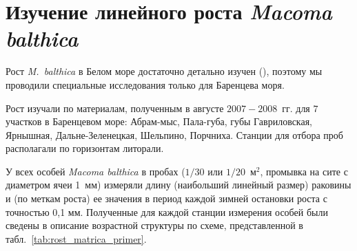\afterpage{\clearpage}

	\section{Изучение линейного роста {\it Macoma balthica}}
Рост \textit{M.~balthica} в Белом море достаточно детально изучен (\cite{Semenova_1970, Maximovich_et_al_1992, Hummel_et_al_1998}), поэтому мы проводили специальные исследования только для Баренцева моря.

Рост изучали по материалам, полученным в августе $2007 - 2008$~гг. для $7$ участков в Баренцевом море: Абрам-мыс, Пала-губа, губы Гавриловская, Ярнышная, Дальне-Зеленецкая, Шельпино, Порчниха.
Станции для отбора проб располагали по горизонтам литорали. 

У всех особей {\it Macoma balthica} в пробах ($1/30$ или $1/20$~м$^2$, промывка на сите с диаметром ячеи 1~мм) измеряли длину (наибольший линейный размер) раковины и (по меткам роста) ее значения в период каждой зимней остановки роста с точностью 0,1 мм.
Полученные для каждой станции измерения особей были сведены в описание возрастной структуры по схеме, представленной в табл.~\ref{tab:rost_matrica_primer}. 
